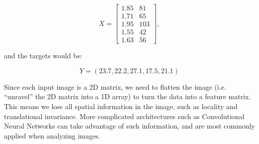 \documentclass[11pt]{article}
\begin{document}
\[ X = \begin{bmatrix}
1.85 & 81\\
1.71 & 65\\
1.95 & 103\\
1.55 & 42\\
1.63 & 56
\end{bmatrix} ,\]

and the targets would be:

\[ Y = (23.7, 22.2, 27.1, 17.5, 21.1) \]

Since each input image is a 2D matrix, we need to flatten the image
(i.e. ``unravel'' the 2D matrix into a 1D array) to turn the data into a
feature matrix. This means we lose all spatial information in the image,
such as locality and translational invariance. More complicated
architectures such as Convolutional Neural Networks can take advantage
of such information, and are most commonly applied when analyzing
images.
\end{document}
